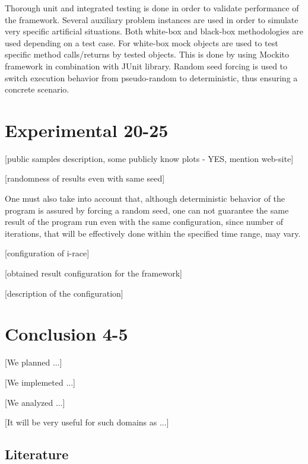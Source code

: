 \documentclass[11pt,a4paper,oneside]{book}
\begin{document}
Thorough unit and integrated testing is done in order to validate performance of the framework. Several auxiliary problem instances are used in order to simulate very specific artificial situations. Both white-box and black-box methodologies are used depending on a test case. For white-box mock objects are used to test specific method calls/returns by tested objects. This is done by using Mockito framework in combination with JUnit library. Random seed forcing is used to switch execution behavior
from pseudo-random to deterministic, thus ensuring a concrete scenario.

\chapter{Experimental 20-25}


[public samples description, some publicly know plots - YES, mention web-site] \newline



[randomness of results even with same seed] \newline

One must also take into account that, although deterministic behavior of the program is assured by forcing a random seed, one can not guarantee the same result of the program run even with the same configuration, since number of iterations, that will be effectively done within the specified time range, may vary.

[configuration of i-race] \newline

[obtained result configuration for the framework] \newline

[description of the configuration]


\chapter{Conclusion 4-5}

[We planned ...]

[We implemeted ...]

[We analyzed ...]

[It will be very useful for such domains as ...]


\section{Literature}




\appendix

\backmatter

\printindex %






\end{document}
